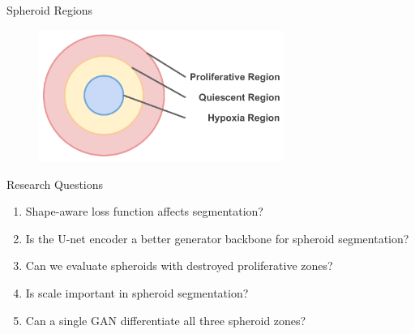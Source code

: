 \begin{frame}{Spheroid Regions}
    \begin{figure}
        \centering
        \includegraphics[width=8cm]{figures/introduction/spheroid_regions}
        \label{fig:spheroid_regions}
    \end{figure}
\end{frame}

\begin{frame}{Research Questions}
        \begin{enumerate}
            \item Shape-aware \alert{loss function affects} segmentation?
            \item Is the U-net encoder a \alert{better generator backbone} for spheroid segmentation?
            \item Can we evaluate spheroids with \alert{destroyed proliferative zones}?
            \item Is \alert{scale} important in spheroid segmentation?
            \item Can a single GAN \alert{differentiate all three spheroid zones}?
        \end{enumerate}
\end{frame}


